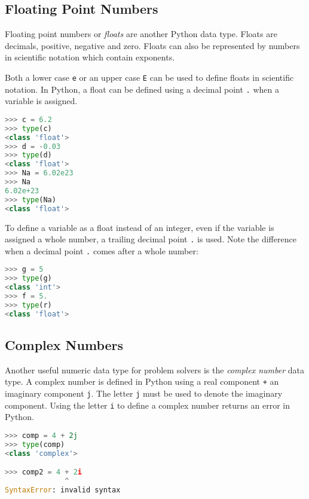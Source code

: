\documentclass{book}
\newcommand{\passthrough}[1]{#1}
\begin{document}
    
        \hypertarget{floating-point-numbers}{%
\subsection{Floating Point Numbers}\label{floating-point-numbers}}

Floating point numbers or \emph{floats} are another Python data type.
Floats are decimals, positive, negative and zero. Floats can also be
represented by numbers in scientific notation which contain exponents.

Both a lower case \passthrough{\lstinline!e!} or an upper case
\passthrough{\lstinline!E!} can be used to define floats in scientific
notation. In Python, a float can be defined using a decimal point
\passthrough{\lstinline!.!} when a variable is assigned.

\begin{lstlisting}[language=Python]
>>> c = 6.2
>>> type(c)
<class 'float'>
>>> d = -0.03
>>> type(d)
<class 'float'>
>>> Na = 6.02e23
>>> Na
6.02e+23
>>> type(Na)
<class 'float'>
\end{lstlisting}

To define a variable as a float instead of an integer, even if the
variable is assigned a whole number, a trailing decimal point
\passthrough{\lstinline!.!} is used. Note the difference when a decimal
point \passthrough{\lstinline!.!} comes after a whole number:

\begin{lstlisting}[language=Python]
>>> g = 5
>>> type(g)
<class 'int'>
>>> f = 5.
>>> type(r)
<class 'float'>
\end{lstlisting}
    




    
        \hypertarget{complex-numbers}{%
\subsection{Complex Numbers}\label{complex-numbers}}

Another useful numeric data type for problem solvers is the
\emph{complex number} data type. A complex number is defined in Python
using a real component \passthrough{\lstinline!+!} an imaginary
component \passthrough{\lstinline!j!}. The letter
\passthrough{\lstinline!j!} must be used to denote the imaginary
component. Using the letter \passthrough{\lstinline!i!} to define a
complex number returns an error in Python.

\begin{lstlisting}[language=Python]
>>> comp = 4 + 2j
>>> type(comp)
<class 'complex'>

>>> comp2 = 4 + 2i
              ^
SyntaxError: invalid syntax
\end{lstlisting}
\end{document}

